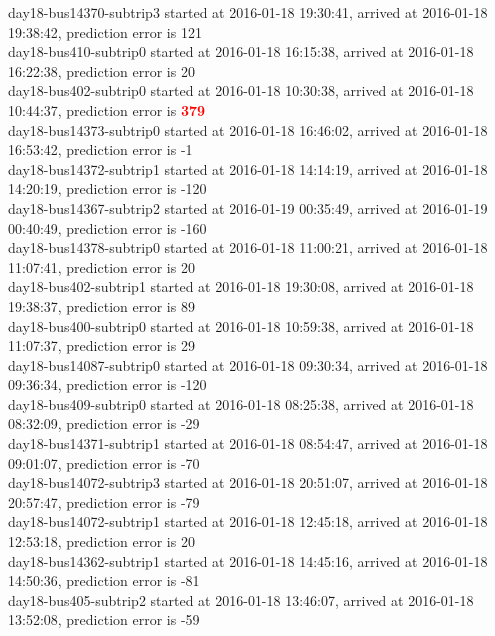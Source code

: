 \documentclass[12pt,a4paper,oneside,openright]{report}
\begin{document}
{day18-bus14370-subtrip3 started at 2016-01-18 19:30:41, arrived at 2016-01-18 19:38:42, prediction error is 121 \\
day18-bus410-subtrip0 started at 2016-01-18 16:15:38,    arrived at 2016-01-18 16:22:38, prediction error is 20 \\
day18-bus402-subtrip0 started at 2016-01-18 10:30:38,    arrived at 2016-01-18 10:44:37, prediction error is \textcolor{red}{\textbf{379}} \\
day18-bus14373-subtrip0 started at 2016-01-18 16:46:02, arrived at 2016-01-18 16:53:42, prediction error is -1 \\
day18-bus14372-subtrip1 started at 2016-01-18 14:14:19, arrived at 2016-01-18 14:20:19, prediction error is -120 \\
day18-bus14367-subtrip2 started at 2016-01-19 00:35:49, arrived at 2016-01-19 00:40:49, prediction error is -160 \\
day18-bus14378-subtrip0 started at 2016-01-18 11:00:21, arrived at 2016-01-18 11:07:41, prediction error is 20 \\
day18-bus402-subtrip1 started at 2016-01-18 19:30:08,    arrived at 2016-01-18 19:38:37, prediction error is 89 \\
day18-bus400-subtrip0 started at 2016-01-18 10:59:38,    arrived at 2016-01-18 11:07:37, prediction error is 29 \\
day18-bus14087-subtrip0 started at 2016-01-18 09:30:34, arrived at 2016-01-18 09:36:34, prediction error is -120 \\
day18-bus409-subtrip0 started at 2016-01-18 08:25:38,    arrived at 2016-01-18 08:32:09, prediction error is -29 \\
day18-bus14371-subtrip1 started at 2016-01-18 08:54:47, arrived at 2016-01-18 09:01:07, prediction error is -70 \\
day18-bus14072-subtrip3 started at 2016-01-18 20:51:07, arrived at 2016-01-18 20:57:47, prediction error is -79 \\
day18-bus14072-subtrip1 started at 2016-01-18 12:45:18, arrived at 2016-01-18 12:53:18, prediction error is 20 \\
day18-bus14362-subtrip1 started at 2016-01-18 14:45:16, arrived at 2016-01-18 14:50:36, prediction error is -81 \\
day18-bus405-subtrip2 started at 2016-01-18 13:46:07,    arrived at 2016-01-18 13:52:08, prediction error is -59 \\
}

\newpage
\end{document}
